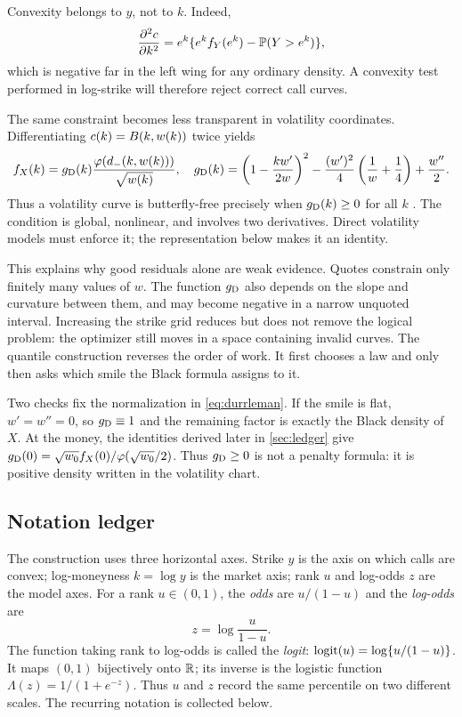 Convexity belongs to $y$, not to $k$.  Indeed,
\[
\frac{\partial^2c}{\partial k^2}
=e^k\{e^kf_Y(e^k)-\mathbb{P}(Y>e^k)\},
\]
which is negative far in the left wing for any ordinary density.  A convexity
test performed in log-strike will therefore reject correct call curves.

The same constraint becomes less transparent in volatility coordinates.
Differentiating $c(k)=B(k,w(k))$ twice yields
\begin{equation}
f_X(k)=g_{\rm D}(k)\frac{\varphi(d_-(k,w(k)))}{\sqrt{w(k)}},
\quad
g_{\rm D}(k)=
\left(1-\frac{k w'}{2w}\right)^2
-\frac{(w')^2}{4}\left(\frac1w+\frac14\right)+\frac{w''}{2}.
\label{eq:durrleman}
\end{equation}
Thus a volatility curve is butterfly-free precisely when
$g_{\rm D}(k)\ge0$ for all $k$ \citep{GatheralJacquier2014}.  The condition is
global, nonlinear, and involves two derivatives.  Direct volatility models
must enforce it; the representation below makes it an identity.

This explains why good residuals alone are weak evidence.  Quotes constrain
only finitely many values of $w$.  The function $g_{\rm D}$ also depends on
the slope and curvature between them, and may become negative in a narrow
unquoted interval.  Increasing the strike grid reduces but does not remove
the logical problem: the optimizer still moves in a space containing invalid
curves.  The quantile construction reverses the order of work.  It first
chooses a law and only then asks which smile the Black formula assigns to it.

Two checks fix the normalization in \eqref{eq:durrleman}.  If the smile is
flat, $w'=w''=0$, so $g_{\rm D}\equiv1$ and the remaining factor is exactly
the Black density of $X$.  At the money, the identities derived later in
\cref{sec:ledger} give
$g_{\rm D}(0)=\sqrt{w_0}f_X(0)/\varphi(\sqrt{w_0}/2)$.  Thus
$g_{\rm D}\ge0$ is not a penalty formula: it is positive density written in
the volatility chart.

\subsection{Notation ledger}

The construction uses three horizontal axes.  Strike $y$ is the axis on which
calls are convex; log-moneyness $k=\log y$ is the market axis; rank $u$ and
log-odds $z$ are the model axes.  For a rank $u\in(0,1)$, the \emph{odds} are
$u/(1-u)$ and the \emph{log-odds} are
\[
z=\log\frac{u}{1-u}.
\]
The function taking rank to log-odds is called the \emph{logit}:
$\operatorname{logit}(u)=\log\{u/(1-u)\}$.  It maps $(0,1)$ bijectively onto $\mathbb{R}$; its
inverse is the logistic function $\Lambda(z)=1/(1+e^{-z})$.  Thus $u$ and $z$
record the same percentile on two different scales.  The recurring notation
is collected below.

